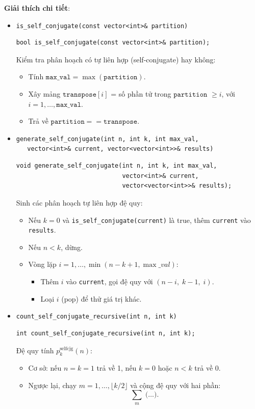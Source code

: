 \documentclass[a4paper,12pt]{article}
\begin{document}
\textbf{Giải thích chi tiết}:
\begin{itemize}

  \item \texttt{is\_self\_conjugate(const vector<int>\& partition)}  
    \begin{lstlisting}[style=cppstyle]
bool is_self_conjugate(const vector<int>& partition);
    \end{lstlisting}
    Kiểm tra phân hoạch có tự liên hợp (self‑conjugate) hay không:
    \begin{itemize}
      \item Tính \(\texttt{max\_val} = \max(\texttt{partition})\).  
      \item Xây mảng \(\texttt{transpose}[i]\) = số phần tử trong \(\texttt{partition}\) \(\ge i\), với \(i=1,\dots,\texttt{max\_val}\).  
      \item Trả về \(\texttt{partition} == \texttt{transpose}\).
    \end{itemize}

  \item \texttt{generate\_self\_conjugate(int n, int k, int max\_val,\\
        \ \ \ vector<int>\& current, vector<vector<int>>\& results)}  
    \begin{lstlisting}[style=cppstyle]
void generate_self_conjugate(int n, int k, int max_val,
                             vector<int>& current,
                             vector<vector<int>>& results);
    \end{lstlisting}
    Sinh các phân hoạch tự liên hợp đệ quy:
    \begin{itemize}
      \item Nếu \(k=0\) và \texttt{is\_self\_conjugate(current)} là true, thêm \texttt{current} vào \texttt{results}.  
      \item Nếu \(n<k\), dừng.  
      \item Vòng lặp \(i=1,\dots,\min(n-k+1,\max\_val)\):  
        \begin{itemize}
          \item Thêm \(i\) vào \texttt{current}, gọi đệ quy với \((n-i,\;k-1,\;i)\).  
          \item Loại \(i\) (pop) để thử giá trị khác.
        \end{itemize}
    \end{itemize}

  \item \texttt{count\_self\_conjugate\_recursive(int n, int k)}  
    \begin{lstlisting}[style=cppstyle]
int count_self_conjugate_recursive(int n, int k);
    \end{lstlisting}
    Đệ quy tính \(p_k^{\mathrm{selfcjg}}(n)\):
    \begin{itemize}
      \item Cơ sở: nếu \(n=k=1\) trả về 1, nếu \(k=0\) hoặc \(n<k\) trả về 0.  
      \item Ngược lại, chạy \(m=1,\dots,\lfloor k/2\rfloor\) và cộng đệ quy với hai phần:  
        \[
          \sum_m \; \bigl(\dots\bigr).
        \]
    \end{itemize}


\end{itemize}
\end{document}
